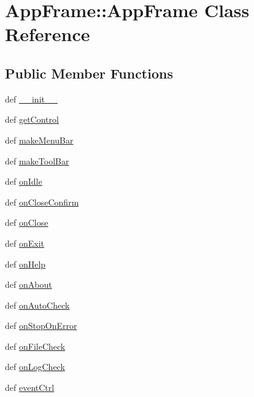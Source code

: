\hypertarget{classAppFrame_1_1AppFrame}{
\section{AppFrame::AppFrame Class Reference}
\label{classAppFrame_1_1AppFrame}
}
\subsection*{Public Member Functions}
\begin{DoxyCompactItemize}
\item 
def \hyperlink{classAppFrame_1_1AppFrame_a99de512a9c17c41f6446a0ad51aa492f}{\_\-\_\-init\_\-\_\-}
\item 
def \hyperlink{classAppFrame_1_1AppFrame_a339ae421d03a4184269c6b7e3537ab08}{getControl}
\item 
def \hyperlink{classAppFrame_1_1AppFrame_a71b05a3223d3ab9595beb5a6158a4658}{makeMenuBar}
\item 
def \hyperlink{classAppFrame_1_1AppFrame_ab4a7fb9bd8d8d66ab94c61281456f8ff}{makeToolBar}
\item 
def \hyperlink{classAppFrame_1_1AppFrame_a4e0dcbd50e131b0098cf1611ad25db6c}{onIdle}
\item 
def \hyperlink{classAppFrame_1_1AppFrame_aaa21bd6cb6d29c0ff8b86aee2b55d146}{onCloseConfirm}
\item 
def \hyperlink{classAppFrame_1_1AppFrame_a5f83beacf1c4e5bd2a27e3c778c96c1e}{onClose}
\item 
def \hyperlink{classAppFrame_1_1AppFrame_a5b5cb5f928c331e97fd7ffcee5458bcf}{onExit}
\item 
def \hyperlink{classAppFrame_1_1AppFrame_a11b969659be042b78227df2738371b6a}{onHelp}
\item 
def \hyperlink{classAppFrame_1_1AppFrame_a8a7202f9eb527cf4513d8b69b385a172}{onAbout}
\item 
def \hyperlink{classAppFrame_1_1AppFrame_ae06136b61e9fb8d5d8594a78bc5b1beb}{onAutoCheck}
\item 
def \hyperlink{classAppFrame_1_1AppFrame_a5d4fbe570c7b419c71b5a28e920ef0b3}{onStopOnError}
\item 
def \hyperlink{classAppFrame_1_1AppFrame_a64fced2976ba648b07d575749a031ce2}{onFileCheck}
\item 
def \hyperlink{classAppFrame_1_1AppFrame_a5fc0d44cdfe82f731a9e8747c0062bdc}{onLogCheck}
\item 
def \hyperlink{classAppFrame_1_1AppFrame_aca8b90caebbf4467fefc23d134e87882}{eventCtrl}

\end{DoxyCompactItemize}
